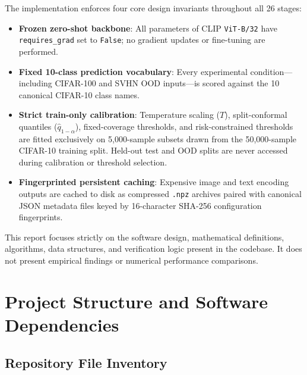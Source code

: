 \documentclass[11pt,a4paper]{article}
\begin{document}
The implementation enforces four core design invariants throughout all 26 stages:
\begin{itemize}
  \item \textbf{Frozen zero-shot backbone}: All parameters of CLIP \texttt{ViT-B/\allowbreak{}32} have \texttt{requires\_\allowbreak{}grad} set to \texttt{False}; no gradient updates or fine-tuning are performed.
  \item \textbf{Fixed 10-class prediction vocabulary}: Every experimental condition---including CIFAR-100 and SVHN OOD inputs---is scored against the 10 canonical CIFAR-10 class names.
  \item \textbf{Strict train-only calibration}: Temperature scaling ($T$), split-conformal quantiles ($\hat{q}_{1-\alpha}$), fixed-coverage thresholds, and risk-constrained thresholds are fitted exclusively on 5,000-sample subsets drawn from the 50,000-sample CIFAR-10 training split. Held-out test and OOD splits are never accessed during calibration or threshold selection.
  \item \textbf{Fingerprinted persistent caching}: Expensive image and text encoding outputs are cached to disk as compressed \texttt{.\allowbreak{}npz} archives paired with canonical JSON metadata files keyed by 16-character SHA-256 configuration fingerprints.
\end{itemize}

This report focuses strictly on the software design, mathematical definitions, algorithms, data structures, and verification logic present in the codebase. It does not present empirical findings or numerical performance comparisons.

\section{Project Structure and Software Dependencies}

\subsection{Repository File Inventory}
\end{document}
